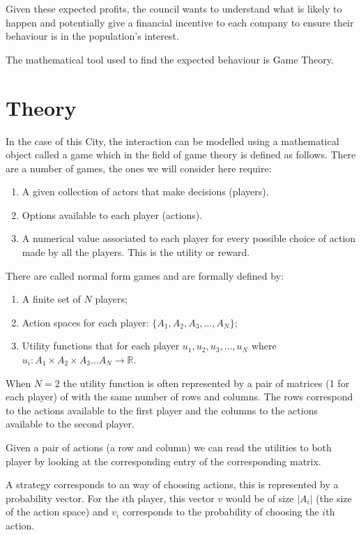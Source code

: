 Given these expected profits, the council wants to understand what is likely to
happen and potentially give a financial incentive to each company to ensure
their behaviour is in the population's interest.

The mathematical tool used to find the expected behaviour is Game Theory.

\section{Theory}\label{sec:theory}

In the case of this City, the interaction can be modelled using a mathematical
object called a game which in the field of game theory is defined as follows.
There are a number of games, the ones we will consider here require:

\begin{enumerate}
    \item A given collection of actors that make decisions (players).
    \item Options available to each player (actions).
    \item A numerical value associated to each player for every possible
        choice of action made by all the players. This is the utility or reward.
\end{enumerate}

There are called normal form games and are formally defined by:

\begin{enumerate}
    \item A finite set of \(N\) players;
    \item Action spaces for each player: \(\{A_1, A_2, A_3, \dots, A_N\}\);
    \item Utility functions that for each player \(u_1, u_2, u_3, \dots, u_N\)
        where \(u_i:A_1\times A_2 \times A_3 \dots A_N \to \mathbb{R}\).
\end{enumerate}

When \(N=2\) the utility function is often represented by a pair of matrices (1
for each player) of with the same number of rows and columns. The rows
correspond to the actions available to the first player and the columns to the
actions available to the second player.

Given a pair of actions (a row and column) we can read the utilities to both
player by looking at the corresponding entry of the corresponding matrix.

A strategy corresponds to an way of choosing actions, this is represented by a
probability vector. For the \(i\)th player, this vector \(v\) would be of size
\(|A_i|\) (the size of the action space) and \(v_i\) corresponds to the
probability of choosing the \(i\)th action.

